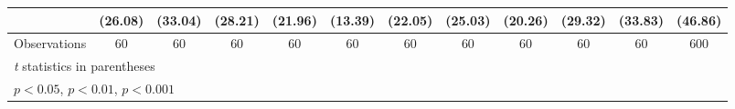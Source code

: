 \begin{table}[htbp]
\begin{tabular}{l*{11}{c}}
                    &     (26.08)         &     (33.04)         &     (28.21)         &     (21.96)         &     (13.39)         &     (22.05)         &     (25.03)         &     (20.26)         &     (29.32)         &     (33.83)         &     (46.86)         \\
\hline
Observations        &          60         &          60         &          60         &          60         &          60         &          60         &          60         &          60         &          60         &          60         &         600         \\
\hline\hline
\multicolumn{12}{l}{\footnotesize \textit{t} statistics in parentheses}\\
\multicolumn{12}{l}{\footnotesize \sym{*} \(p<0.05\), \sym{**} \(p<0.01\), \sym{***} \(p<0.001\)}\\
\end{tabular}
\end{table}
